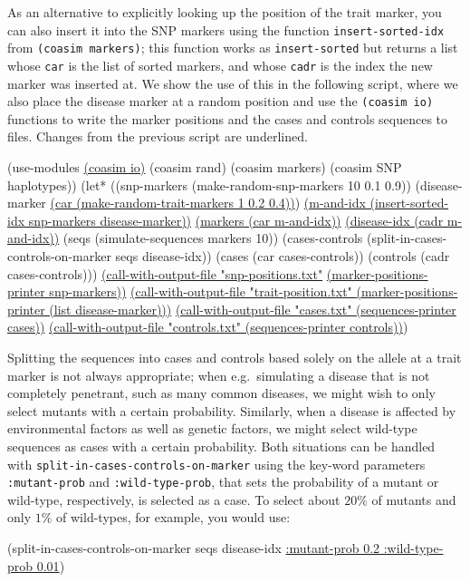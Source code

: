 \documentclass{manual}
\begin{document}
\begin{empfile}
As an alternative to explicitly looking up the position of the trait
marker, you can also insert it into the SNP markers using the function
\texttt{insert-sorted-idx} from \texttt{(coasim markers)}; this
function works as \texttt{insert-sorted} but returns a list whose
\texttt{car} is the list of sorted markers, and whose \texttt{cadr} is
the index the new marker was inserted at.  We show the use of this in
the following script, where we also place the disease marker at a
random position and use the \texttt{(coasim io)} functions to write
the marker positions and the cases and controls sequences to files.
Changes from the previous script are underlined.
\begin{code}
(use-modules \underline{(coasim io)} (coasim rand)
             (coasim markers) (coasim SNP haplotypes))
(let* ((snp-markers    (make-random-snp-markers   10 0.1 0.9))
       (disease-marker \underline{(car (make-random-trait-markers 1 0.2 0.4))})
       \underline{(m-and-idx (insert-sorted-idx snp-markers disease-marker))}
       \underline{(markers (car m-and-idx))}
       \underline{(disease-idx (cadr m-and-idx))}
       (seqs (simulate-sequences markers 10))
       (cases-controls (split-in-cases-controls-on-marker seqs disease-idx))
       (cases (car cases-controls))
       (controls (cadr cases-controls)))
  \underline{(call-with-output-file "snp-positions.txt"}
  \underline{  (marker-positions-printer snp-markers))}
  \underline{(call-with-output-file "trait-position.txt" }
  \underline{  (marker-positions-printer (list disease-marker)))}
  \underline{(call-with-output-file "cases.txt"    (sequences-printer cases))}
  \underline{(call-with-output-file "controls.txt" (sequences-printer controls))})
\end{code}

Splitting the sequences into cases and controls based solely on the
allele at a trait marker is not always appropriate; when e.g.\ 
simulating a disease that is not completely penetrant, such as many
common diseases, we might wish to only select mutants with a certain
probability.  Similarly, when a disease is affected by environmental
factors as well as genetic factors, we might select wild-type
sequences as cases with a certain probability.  Both situations can be
handled with \texttt{split-in-cases-controls-on-marker} using the key-word
parameters \texttt{:mutant-prob} and \texttt{:wild-type-prob}, that
sets the probability of a mutant or wild-type, respectively, is
selected as a case.  To select about $20\%$ of mutants and only
$1\%$ of wild-types, for example, you would use:
\begin{code}
(split-in-cases-controls-on-marker seqs disease-idx
                                   \underline{:mutant-prob 0.2 :wild-type-prob 0.01})
\end{code}




\end{empfile}
\end{document}
